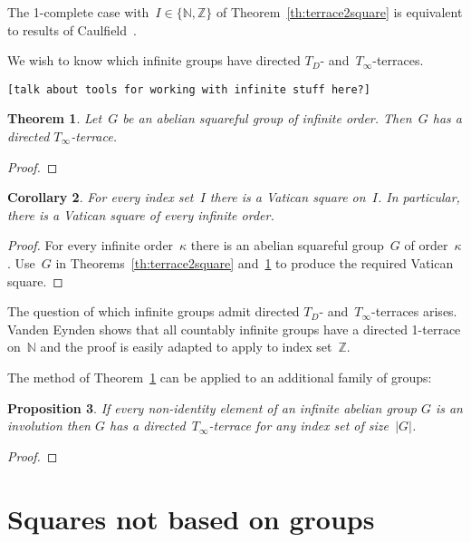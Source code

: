 \documentclass[12pt,a4paper]{article}
\newtheorem{thm}{Theorem}[section]
\newtheorem{cor}[thm]{Corollary}
\newtheorem{prop}[thm]{Proposition}
\newcommand{\Z}{\mathbb{Z}}
\newcommand{\N}{\mathbb{N}}
\begin{document}
The 1-complete case with~$I \in \{ \N, \Z \}$ of Theorem~\ref{th:terrace2square} is equivalent to results of Caulfield~\cite{Caulfield96}.

We wish to know which infinite groups have directed $T_D$- and~$T_{\infty}$-terraces.  

\texttt{[talk about tools for working with infinite stuff here?]}


\begin{thm}\label{th:T_infty}
Let~$G$ be an abelian squareful group of infinite order.   Then~$G$ has a directed $T_{\infty}$-terrace.
\end{thm}

\begin{proof}

\end{proof}


\begin{cor}\label{cor:vatsquares}
For every index set~$I$ there is a Vatican square on~$I$.  In particular, there is a Vatican square of every infinite order.
\end{cor}

\begin{proof}
For every infinite order~$\kappa$ there is an abelian squareful group~$G$ of order~$\kappa$. Use~$G$ in Theorems~\ref{th:terrace2square} and~\ref{th:T_infty} to produce the required Vatican square.
\end{proof}

The question of which infinite groups admit directed $T_D$- and~$T_{\infty}$-terraces arises.  Vanden Eynden shows that all countably infinite groups have a directed 1-terrace on~$\N$ \cite{VE78} and the proof is easily adapted to apply to index set~$\Z$.  

The method of Theorem~\ref{th:T_infty} can be applied to an additional family of groups:

\begin{prop}\label{prop:allinv}
If every non-identity element of an infinite abelian group $G$ is an involution then $G$ has a directed~$T_{\infty}$-terrace for any index set of size~$|G|$. 
\end{prop}

\begin{proof}

\end{proof}



\section{Squares not based on groups}\label{sec:notgp}
\end{document}
